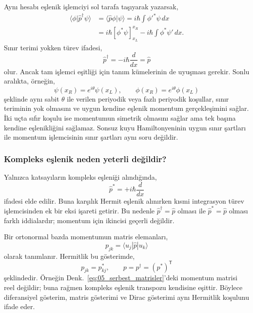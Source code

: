 Aynı hesabı eşlenik işlemciyi sol tarafa taşıyarak yazarsak,
\begin{align}
 \langle\phi|\hat p^\dagger\psi\rangle
 &=\langle\hat p\phi|\psi\rangle
 =i\hbar\int\phi'^*\psi\,dx\\
 &=i\hbar[\phi^*\psi]_{x_L}^{x_R}
   -i\hbar\int\phi^*\psi'\,dx.
\end{align}
Sınır terimi yokken türev ifadesi,
\begin{equation}
 \hat p^\dagger=-i\hbar\frac{d}{dx}=\hat p
\end{equation}
olur. Ancak tam işlemci eşitliği için tanım kümelerinin de
uyuşması gerekir. Sonlu aralıkta, örneğin,
\begin{equation}
 \psi(x_R)=e^{i\theta}\psi(x_L),\qquad
 \phi(x_R)=e^{i\theta}\phi(x_L)
\end{equation}
şeklinde aynı sabit $\theta$ ile verilen periyodik veya fazlı
periyodik koşullar, sınır teriminin yok olmasını ve uygun kendine
eşlenik momentum gerçekleşimini sağlar. İki uçta sıfır koşulu ise
momentumun simetrik olmasını sağlar ama tek başına kendine
eşlenikliğini sağlamaz. Sonsuz kuyu Hamiltonyeninin uygun sınır
şartları ile momentum işlemcisinin sınır şartları aynı soru değildir.

\subsubsection*{Kompleks eşlenik neden yeterli değildir?}

Yalnızca katsayıların kompleks eşleniği alındığında,
\begin{equation}
 \hat p^*=+i\hbar\frac{d}{dx}
\end{equation}
ifadesi elde edilir. Buna karşılık Hermit eşlenik alınırken kısmi
integrasyon türev işlemcisinden ek bir eksi işareti getirir. Bu
nedenle $\hat p^\dagger=\hat p$ olması ile
$\hat p^*=\hat p$ olması farklı iddialardır; momentum için ikincisi
geçerli değildir.

Bir ortonormal bazda momentumun matris elemanları,
\begin{equation}
 p_{jk}=\langle u_j|\hat p|u_k\rangle
\end{equation}
olarak tanımlanır. Hermitlik bu gösterimde,
\begin{equation}
 p_{jk}=p_{kj}^*,\qquad p=p^\dagger=(p^*)^{\mathsf T}
\end{equation}
şeklindedir. Örneğin Denk.~\eqref{eq:05_serbest_matrisler}'deki
momentum matrisi reel değildir; buna rağmen kompleks eşlenik
transpozu kendisine eşittir. Böylece diferansiyel gösterim, matris
gösterimi ve Dirac gösterimi aynı Hermitlik koşulunu ifade eder.

\BolumKaynakcaBitir

